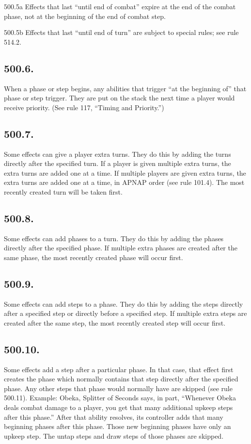 500.5a Effects that last “until end of combat” expire at the end of the combat phase, not at the beginning of the end of combat step.

500.5b Effects that last “until end of turn” are subject to special rules; see rule 514.2.

\subsection*{500.6.}
When a phase or step begins, any abilities that trigger “at the beginning of” that phase or step trigger. They are put on the stack the next time a player would receive priority. (See rule 117, “Timing and Priority.”)

\subsection*{500.7.}
Some effects can give a player extra turns. They do this by adding the turns directly after the specified turn. If a player is given multiple extra turns, the extra turns are added one at a time. If multiple players are given extra turns, the extra turns are added one at a time, in APNAP order (see rule 101.4). The most recently created turn will be taken first.

\subsection*{500.8.}
Some effects can add phases to a turn. They do this by adding the phases directly after the specified phase. If multiple extra phases are created after the same phase, the most recently created phase will occur first.

\subsection*{500.9.}
Some effects can add steps to a phase. They do this by adding the steps directly after a specified step or directly before a specified step. If multiple extra steps are created after the same step, the most recently created step will occur first.

\subsection*{500.10.}
Some effects add a step after a particular phase. In that case, that effect first creates the phase which normally contains that step directly after the specified phase. Any other steps that phase would normally have are skipped (see rule 500.11).
Example: Obeka, Splitter of Seconds says, in part, “Whenever Obeka deals combat damage to a player, you get that many additional upkeep steps after this phase.” After that ability resolves, its controller adds that many beginning phases after this phase. Those new beginning phases have only an upkeep step. The untap steps and draw steps of those phases are skipped.

